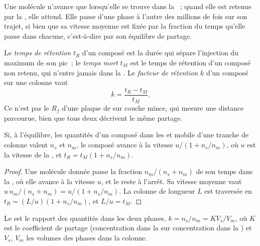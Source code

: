 Une molécule n'avance que lorsqu'elle se trouve dans la ~; quand elle est retenue par la , elle attend. Elle passe d'une phase à l'autre des millions de fois sur son trajet, si bien
que sa vitesse moyenne est fixée par la fraction du temps qu'elle passe dans chacune, c'est-à-dire par
son équilibre de partage.

\begin{definition}[Rétention]\label{def:b2:chromatography:retention}
Le \emph{temps de rétention} $t_R$ d'un composé est la durée
qui sépare l'injection du maximum de son pic~; le \emph{temps mort} $t_M$ est le temps
de rétention d'un composé non retenu, qui n'entre jamais dans la . Le \emph{facteur de
rétention}
$k$ d'un composé sur une colonne vaut
\begin{equation*}
k = \frac{t_R - t_M}{t_M}.
\end{equation*}
Ce n'est pas le $R_f$ d'une plaque de  sur couche mince, qui mesure une distance
parcourue, bien que tous deux décrivent le même partage.
\end{definition}

\begin{proposition}\label{prop:b2:chromatography:retention-time}
Si, à l'équilibre, les quantités d'un composé dans les  et mobile d'une tranche de
colonne valent $n_s$ et $n_m$, le composé avance à la vitesse $u/(1 + n_s/n_m)$, où $u$ est la vitesse de
la , et $t_R = t_M(1 + n_s/n_m)$.
\end{proposition}

\begin{proof}
Une molécule donnée passe la fraction $n_m/(n_s + n_m)$ de son temps dans la , où elle avance
à la vitesse
$u$, et le reste à l'arrêt. Sa vitesse moyenne vaut $u\,n_m/(n_s + n_m) = u/(1 + n_s/n_m)$. La colonne de
longueur $L$ est traversée en $t_R = (L/u)(1 + n_s/n_m)$, et $L/u = t_M$.
\end{proof}

\begin{proposition}\label{prop:b2:chromatography:k-and-K}
Le  est le rapport des quantités dans les deux phases, $k = n_s/n_m = KV_s/V_m$, où $K$
est le coefficient de partage (concentration dans la  sur concentration dans la ) et $V_s$, $V_m$ les volumes des phases dans la colonne.
\end{proposition}


